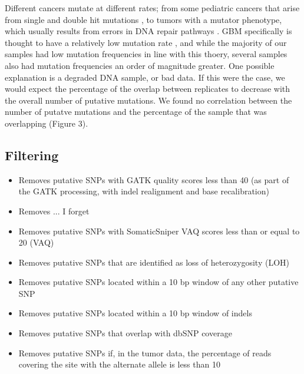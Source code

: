 \documentclass[11pt]{article} %
\begin{document}
Different cancers mutate at different rates; from some pediatric cancers that arise from single and double hit mutations \cite{pediatric}, to tumors with a mutator phenotype, which usually results from errors in DNA repair pathways \cite{mutator}. GBM specifically is thought to have a relatively low mutation rate \cite{GBM_mut_rate}, and while the majority of our samples had low mutation frequencies in line with this thoery, several samples also had mutation frequencies an order of magnitude greater. One possible explanation is a degraded DNA sample, or bad data. If this were the case, we would expect the percentage of the overlap between replicates to decrease with the overall number of putative mutations. We found no correlation between the number of putatve mutations and the percentage of the sample that was overlapping (Figure 3). 

\subsection{Filtering}

\begin{itemize}
	\item Removes putative SNPs with GATK quality scores less than 40 (as part of the GATK processing, with indel realignment and base recalibration)
	\item Removes ... I forget
	\item Removes putative SNPs with SomaticSniper VAQ scores less than or equal to 20 (VAQ)
	\item Removes putative SNPs that are identified as loss of heterozygosity (LOH)
	\item Removes putative SNPs located within a 10 bp window of any other putative SNP
	\item Removes putative SNPs located within a 10 bp window of indels
	\item Removes putative SNPs that overlap with dbSNP coverage
	\item Removes putative SNPs if, in the tumor data, the percentage of reads covering the site with the alternate allele is less than 10%
\end{itemize}
\end{document}

